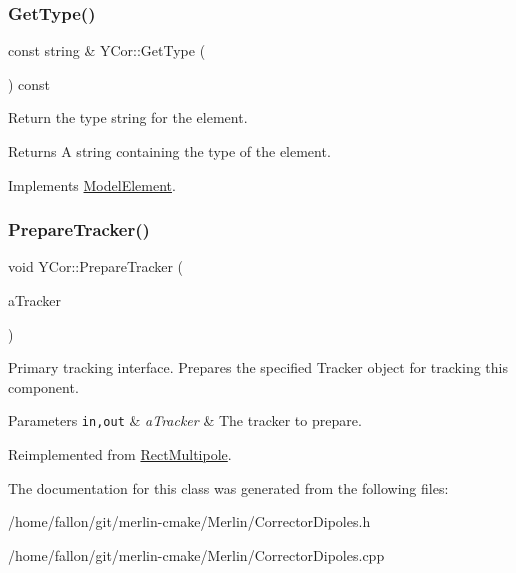 \mbox{\label{classYCor_afd6affaaca36f2c9a096eea1f6a1a767}} 
\subsubsection{\texorpdfstring{Get\+Type()}{GetType()}}
{\footnotesize\ttfamily const string \& Y\+Cor\+::\+Get\+Type (\begin{DoxyParamCaption}{ }\end{DoxyParamCaption}) const\hspace{0.3cm}{\ttfamily [virtual]}}

Return the type string for the element. \begin{DoxyReturn}{Returns}
A string containing the type of the element. 
\end{DoxyReturn}


Implements \hyperlink{classModelElement_a04dc2e51e1999fca612eb1838ec6b271}{Model\+Element}.

\mbox{\label{classYCor_a6d5d11f3128222ae114d250a2f7d62bb}} 
\subsubsection{\texorpdfstring{Prepare\+Tracker()}{PrepareTracker()}}
{\footnotesize\ttfamily void Y\+Cor\+::\+Prepare\+Tracker (\begin{DoxyParamCaption}\item[{\hyperlink{classComponentTracker}{Component\+Tracker} \&}]{a\+Tracker }\end{DoxyParamCaption})\hspace{0.3cm}{\ttfamily [virtual]}}

Primary tracking interface. Prepares the specified Tracker object for tracking this component. 
\begin{DoxyParams}[1]{Parameters}
\mbox{\tt in,out}  & {\em a\+Tracker} & The tracker to prepare. \\
\hline
\end{DoxyParams}


Reimplemented from \hyperlink{classRectMultipole_a2626d08254eee03cffb73abb20a9381a}{Rect\+Multipole}.



The documentation for this class was generated from the following files\+:\begin{DoxyCompactItemize}
\item 
/home/fallon/git/merlin-\/cmake/\+Merlin/Corrector\+Dipoles.\+h\item 
/home/fallon/git/merlin-\/cmake/\+Merlin/Corrector\+Dipoles.\+cpp\end{DoxyCompactItemize}
